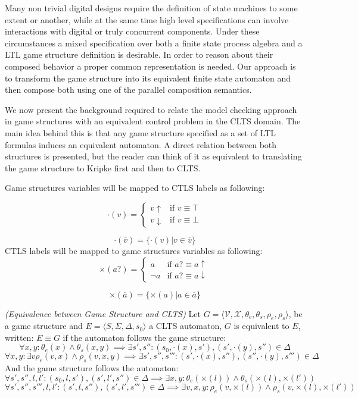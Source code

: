 Many non trivial digital designs require the definition of state machines to some extent or another, while at the same time high level specifications can involve interactions with digital or truly concurrent components. Under these circumstances a mixed specification over both a finite state process algebra and a LTL game structure definition is desirable.  In order to reason about their composed behavior a proper common representation is needed. Our approach is to transform the game structure into its equivalent finite state automaton and then compose both using one of the parallel composition semantics.

We now present the background required to relate the model checking approach in game structures with an equivalent control problem in the CLTS domain.  The main idea behind this is that any game structure specified as a set of LTL formulas induces an equivalent automaton. A direct relation between both structures is presented, but the reader can think of it as equivalent to translating the game structure to Kripke first and then to CLTS.

Game structures variables will be mapped to CTLS labels as following:

\[
\cdot(v) = \begin{cases}
v\uparrow & \text{if } v \equiv \top \\
v\downarrow & \text{if } v \equiv \bot
\end{cases}
\]

\[\cdot(\overline{v}) = \lbrace \cdot (v) | v \in \overline{v} \rbrace \]
CTLS labels will be mapped to game structures variables as following:
\[
\times (a?) = \begin{cases}
a & \text{if } a? \equiv a\uparrow \\
\neg a & \text{if } a? \equiv a\downarrow
\end{cases}
\]

\[\times(\overline{a}) = \lbrace \times (a) | a \in \overline{a} \rbrace \]

\begin{definition}
	\label{def:gs_clts_equivalence} \emph{(Equivalence between Game Structure and CLTS)} 
	Let $G=\langle \mathcal{V}, \mathcal{X}, \theta_{e}, \theta_{s}, \rho_{e}, \rho_{s}\rangle$, be a game structure and $E=\langle S, \Sigma, \Delta, s_{0}\rangle$ a CLTS automaton, $G$ is equivalent to $E$, written: $E \equiv G$ if the automaton follows the game structure:
	\[
	\forall x, y: \theta_e(x) \wedge \theta_s(x,y) \implies \exists s',s'' : (s_0, \cdot (x), s'), (s', \cdot (y), s'') \in \Delta 
	\] 
	\[
	\forall x, y : \exists v \rho_e(v,x) \wedge \rho_s(v,x,y) \implies \exists s',s'',s''' : (s', \cdot (x), s''), (s'', \cdot (y), s''') \in \Delta 
	\] 
	And the game structure follows the automaton:	
	\[
	\forall  s',s'',l,l' : (s_0, l, s'), (s', l', s'') \in \Delta  \implies \exists x,y: \theta_e(\times(l)) \wedge \theta_s(\times(l),\times(l'))
	\] 
	\[
	\forall  s',s'',s''',l,l' : (s', l, s''), (s', l', s''') \in \Delta  \implies \exists v,x,y: \rho_e(v,\times(l)) \wedge \rho_s(v,\times(l),\times(l'))
	\] 	%
\end{definition}


